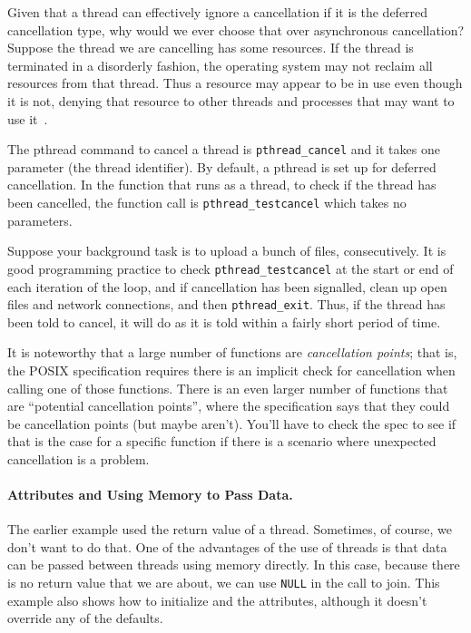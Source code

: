 Given that a thread can effectively ignore a cancellation if it is the deferred cancellation type, why would we ever choose that over asynchronous cancellation? Suppose the thread we are cancelling has some resources. If the thread is terminated in a disorderly fashion, the operating system may not reclaim all resources from that thread. Thus a resource may appear to be in use even though it is not, denying that resource to other threads and processes that may want to use it~\cite{osc}.

The pthread command to cancel a thread is \texttt{pthread\_cancel} and it takes one parameter (the thread identifier). By default, a pthread is set up for deferred cancellation. In the function that runs as a thread, to check if the thread has been cancelled, the function call is \texttt{pthread\_testcancel} which takes no parameters.

Suppose your background task is to upload a bunch of files, consecutively. It is good programming practice to check \texttt{pthread\_testcancel} at the start or end of each iteration of the loop, and if cancellation has been signalled, clean up open files and network connections, and then \texttt{pthread\_exit}. Thus, if the thread has been told to cancel, it will do as it is told within a fairly short period of time.

It is noteworthy that a large number of functions are \textit{cancellation points}; that is, the POSIX specification requires there is an implicit check for cancellation when calling one of those functions. There is an even larger number of functions that are ``potential cancellation points'', where the specification says that they could be cancellation points (but maybe aren't). You'll have to check the spec to see if that is the case for a specific function if there is a scenario where unexpected cancellation is a problem.


\paragraph{Attributes and Using Memory to Pass Data.}
The earlier example used the return value of a thread. Sometimes, of course, we don't want to do that. One of the advantages of the use of threads is that data can be passed between threads using memory directly. In this case, because there is no return value that we are about, we can use \texttt{NULL} in the call to join. This example also shows how to initialize and the attributes, although it doesn't override any of the defaults.


